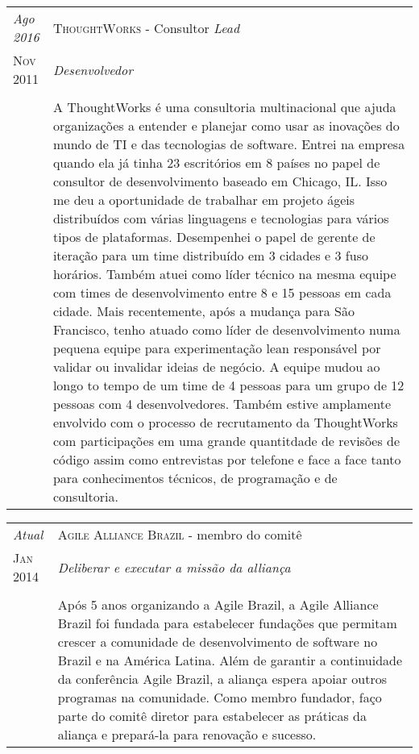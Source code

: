 \documentclass[letter,10pt]{article}
\begin{document}
\begin{tabular}{p{2.5cm}|p{13.5cm}}
  \emph{Ago 2016} & \textsc{ThoughtWorks} - Consultor \textit{Lead}\\
  \textsc{Nov 2011}& \emph{Desenvolvedor}\\
  &\\
  &A ThoughtWorks é uma consultoria multinacional que ajuda organizações a entender e planejar como usar as inovações do mundo de TI e das tecnologias de software. Entrei na empresa quando ela já tinha 23 escritórios em 8 países no papel de consultor de desenvolvimento baseado em Chicago, IL. Isso me deu a oportunidade de trabalhar em projeto ágeis distribuídos com várias linguagens e tecnologias para vários tipos de plataformas. Desempenhei o papel de gerente de iteração para um time distribuído em 3 cidades e 3 fuso horários. Também atuei como líder técnico na mesma equipe com times de desenvolvimento entre 8 e 15 pessoas em cada cidade. Mais recentemente, após a mudança para São Francisco, tenho atuado como líder de desenvolvimento numa pequena equipe para experimentação lean responsável por validar ou invalidar ideias de negócio. A equipe mudou ao longo to tempo de um time de 4 pessoas para um grupo de 12 pessoas com 4 desenvolvedores. Também estive amplamente envolvido com o processo de recrutamento da ThoughtWorks com participações em uma grande quantitdade de revisões de código assim como entrevistas por telefone e face a face tanto para conhecimentos técnicos, de programação e de consultoria.
\end{tabular}

\begin{tabular}{p{2.5cm}|p{13.5cm}}
  \emph{Atual} & \textsc{Agile Alliance Brazil} - membro do comitê\\
  \textsc{Jan 2014}& \emph{Deliberar e executar a missão da alliança}\\
  &\\
  & Após 5 anos organizando a Agile Brazil, a Agile Alliance Brazil foi
  fundada para estabelecer fundações que permitam crescer a comunidade
  de desenvolvimento de software no Brazil e na América Latina. Além de
  garantir a continuidade da conferência Agile Brazil, a aliança espera
  apoiar outros programas na comunidade. Como membro fundador, faço parte
  do comitê diretor para estabelecer as práticas da aliança e prepará-la
  para renovação e sucesso.
\end{tabular}
\end{document}
